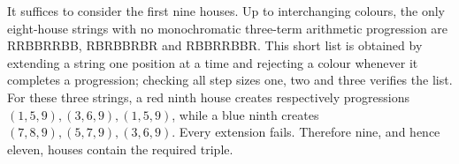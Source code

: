 It suffices to consider the first nine houses. Up to interchanging colours, the only eight-house strings with no monochromatic three-term arithmetic progression are RRBBRRBB, RBRBBRBR and RBBRRBBR. This short list is obtained by extending a string one position at a time and rejecting a colour whenever it completes a progression; checking all step sizes one, two and three verifies the list. For these three strings, a red ninth house creates respectively progressions $(1,5,9),(3,6,9),(1,5,9)$, while a blue ninth creates $(7,8,9),(5,7,9),(3,6,9)$. Every extension fails. Therefore nine, and hence eleven, houses contain the required triple.
